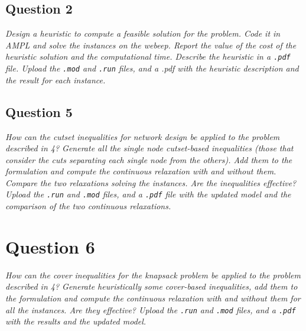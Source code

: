 \documentclass[10pt]{article}
\begin{document}
    \subsection*{Question 2}
    \textit{Design a heuristic to compute a feasible solution for the problem. Code it in AMPL and solve the instances on the webeep. Report the value of the cost of the heuristic solution and the computational time. Describe the heuristic in a \texttt{.pdf} file. Upload the \texttt{.mod} and \texttt{.run} files, and a .pdf with the heuristic description and the result for each instance.}

	

	


    \subsection*{Question 5}
    \textit{How can the cutset inequalities for network design be applied to the problem described in 4? Generate all the single node cutset-based inequalities (those that consider the cuts separating each single node from the others). Add them to the formulation and compute the continuous relaxation with and without them. Compare the two relaxations solving the instances. Are the inequalities effective? Upload the \texttt{.run} and \texttt{.mod} files, and a \texttt{.pdf} file with the updated model and the comparison of the two continuous relaxations.}

    \section*{Question 6}
    \textit{How can the cover inequalities for the knapsack problem be applied to the problem described in 4? Generate heuristically some cover-based inequalities, add them to the formulation and compute the continuous relaxation with and without them for all the instances. Are they effective? Upload the \texttt{.run} and \texttt{.mod} files, and a \texttt{.pdf} with the results and the updated model.}
\end{document}

